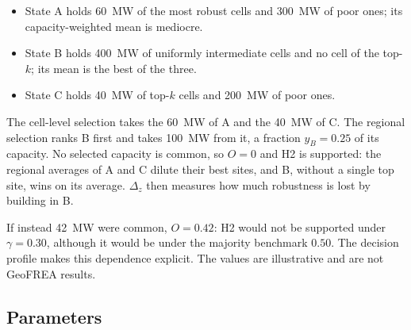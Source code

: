 \begin{itemize}
    \item State A holds 60~MW of the most robust cells and 300~MW of poor ones;
    its capacity-weighted mean is mediocre.
    \item State B holds 400~MW of uniformly intermediate cells and no cell of
    the top-$k$; its mean is the best of the three.
    \item State C holds 40~MW of top-$k$ cells and 200~MW of poor ones.
\end{itemize}
The cell-level selection takes the 60~MW of A and the 40~MW of C. The regional
selection ranks B first and takes 100~MW from it, a fraction $y_B=0.25$ of its
capacity. No selected capacity is common, so $O=0$ and H2 is supported: the
regional averages of A and C dilute their best sites, and B, without a single
top site, wins on its average. $\Delta_z$ then measures how much robustness is
lost by building in B.

If instead 42~MW were common, $O=0.42$: H2 would not be supported under
$\gamma=0.30$, although it would be under the majority benchmark $0.50$. The
decision profile makes this dependence explicit. The values are illustrative
and are not GeoFREA results.

\subsection{Parameters}
\label{subsec:h2_parameters}

